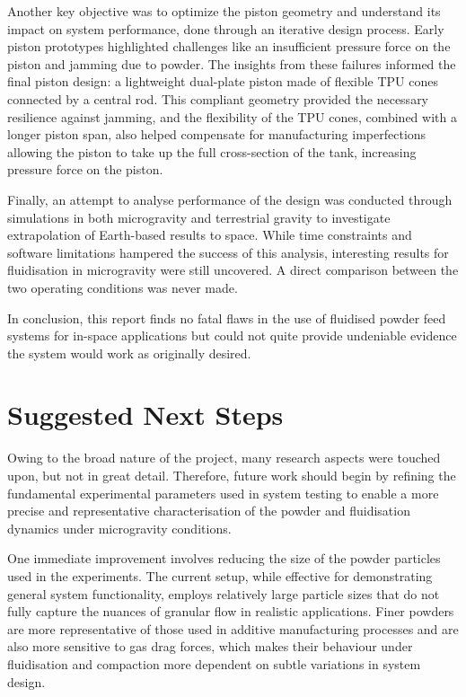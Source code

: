 Another key objective was to optimize the piston geometry and understand its impact on system performance, done through an iterative design process. Early piston prototypes highlighted challenges like an insufficient pressure force on the piston and jamming due to powder. The insights from these failures informed the final piston design: a lightweight dual-plate piston made of flexible TPU cones connected by a central rod. This compliant geometry provided the necessary resilience against jamming, and the flexibility of the TPU cones, combined with a longer piston span, also helped compensate for manufacturing imperfections allowing the piston to take up the full cross-section of the tank, increasing pressure force on the piston. 

Finally, an attempt to analyse performance of the design was conducted through simulations in both microgravity and terrestrial gravity to investigate extrapolation of Earth-based results to space. While time constraints and software limitations hampered the success of this analysis, interesting results for fluidisation in microgravity were still uncovered. A direct comparison between the two operating conditions was never made.

In conclusion, this report finds no fatal flaws in the use of fluidised powder feed systems for in-space applications but could not quite provide undeniable evidence the system would work as originally desired.

\section{Suggested Next Steps}
Owing to the broad nature of the project, many research aspects were touched upon, but not in great detail. Therefore, future work should begin by refining the fundamental experimental parameters used in system testing to enable a more precise and representative characterisation of the powder and fluidisation dynamics under microgravity conditions. 

One immediate improvement involves reducing the size of the powder particles used in the experiments. The current setup, while effective for demonstrating general system functionality, employs relatively large particle sizes that do not fully capture the nuances of granular flow in realistic applications. Finer powders are more representative of those used in additive manufacturing processes and are also more sensitive to gas drag forces, which makes their behaviour under fluidisation and compaction more dependent on subtle variations in system design. 

